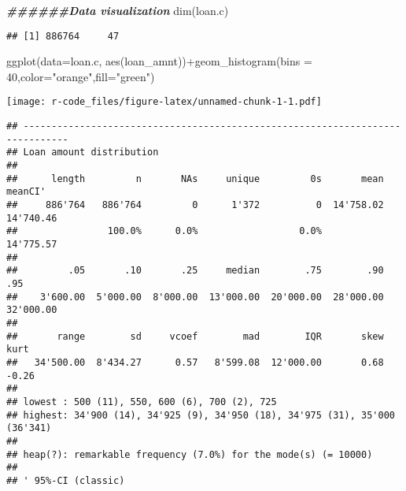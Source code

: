 \documentclass[
]{article}
\newenvironment{Shaded}{\begin{snugshade}}{\end{snugshade}}
\newcommand{\AttributeTok}[1]{\textcolor[rgb]{0.77,0.63,0.00}{#1}}
\newcommand{\ConstantTok}[1]{\textcolor[rgb]{0.00,0.00,0.00}{#1}}
\newcommand{\DecValTok}[1]{\textcolor[rgb]{0.00,0.00,0.81}{#1}}
\newcommand{\DocumentationTok}[1]{\textcolor[rgb]{0.56,0.35,0.01}{\textbf{\textit{#1}}}}
\newcommand{\FunctionTok}[1]{\textcolor[rgb]{0.00,0.00,0.00}{#1}}
\newcommand{\NormalTok}[1]{#1}
\newcommand{\SpecialCharTok}[1]{\textcolor[rgb]{0.00,0.00,0.00}{#1}}
\newcommand{\StringTok}[1]{\textcolor[rgb]{0.31,0.60,0.02}{#1}}
\begin{document}
\begin{Shaded}
\begin{Highlighting}[]
\DocumentationTok{\#\#\#\#\#\#Data visualization}
\FunctionTok{dim}\NormalTok{(loan.c)}
\end{Highlighting}
\end{Shaded}

\begin{verbatim}
## [1] 886764     47
\end{verbatim}

\begin{Shaded}
\begin{Highlighting}[]
\FunctionTok{ggplot}\NormalTok{(}\AttributeTok{data=}\NormalTok{loan.c, }\FunctionTok{aes}\NormalTok{(loan\_amnt))}\SpecialCharTok{+}\FunctionTok{geom\_histogram}\NormalTok{(}\AttributeTok{bins =} \DecValTok{40}\NormalTok{,}\AttributeTok{color=}\StringTok{"orange"}\NormalTok{,}\AttributeTok{fill=}\StringTok{"green"}\NormalTok{)}
\end{Highlighting}
\end{Shaded}

\texttt{[image: r-code\_files/figure-latex/unnamed-chunk-1-1.pdf]}

\begin{Shaded}
\end{Shaded}

\begin{verbatim}
## ------------------------------------------------------------------------------ 
## Loan amount distribution
## 
##      length         n       NAs     unique         0s       mean     meanCI'
##     886'764   886'764         0      1'372          0  14'758.02  14'740.46
##                100.0%      0.0%                  0.0%             14'775.57
##                                                                            
##         .05       .10       .25     median        .75        .90        .95
##    3'600.00  5'000.00  8'000.00  13'000.00  20'000.00  28'000.00  32'000.00
##                                                                            
##       range        sd     vcoef        mad        IQR       skew       kurt
##   34'500.00  8'434.27      0.57   8'599.08  12'000.00       0.68      -0.26
##                                                                            
## lowest : 500 (11), 550, 600 (6), 700 (2), 725
## highest: 34'900 (14), 34'925 (9), 34'950 (18), 34'975 (31), 35'000 (36'341)
## 
## heap(?): remarkable frequency (7.0%) for the mode(s) (= 10000)
## 
## ' 95%-CI (classic)
\end{verbatim}
\end{document}
